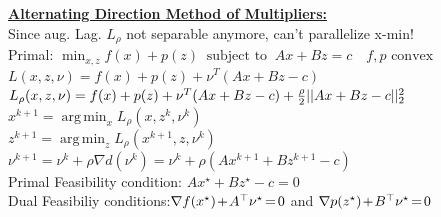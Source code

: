 \documentclass[a4paper,11pt]{article}
\newcommand{\argmin}{\operatorname*{arg\,min}}
\begin{document}
\begin{multicols}{2}
\underline{\textbf{Alternating Direction Method of Multipliers:}}\\
Since aug. Lag. $L_\rho$ not separable anymore, can't parallelize x-min!\\
Primal: $\min_{x, z} f(x) + p(z)\ \text{ subject to }\ Ax+Bz = c \quad f,p \text{ convex}$\\
$L(x, z, \nu) = f(x) + p(z)+ \nu^T (Ax+Bz-c)$\\
$L_\rho(x, z, \nu) = f(x) + p(z)+ \nu^T (Ax+Bz-c) + {\rho \over 2}||Ax + Bz- c||_2^2$\\
\hspace{0.2cm}$x^{k+1} = \argmin_x L_\rho (x, z^k, \nu^k)$\\
\hspace{0.2cm}$z^{k+1} = \argmin_z L_\rho(x^{k+1}, z, \nu^k)$\\
\hspace{0.2cm}$\nu^{k+1} = \nu^k + \rho \nabla d(\nu^k) = \nu^k + \rho(Ax^{k+1}+Bz^{k+1}-c)$\\
Primal Feasibility condition: $Ax^\star + Bz^\star - c = 0$\\
Dual Feasibiliy conditions:$\nabla f(x^\star) \hspace{-0.05cm} + \hspace{-0.05cm} A^\top \nu^\star \hspace{-0.05cm} = \hspace{-0.05cm} 0$ and $\nabla p(z^\star) \hspace{-0.05cm} + \hspace{-0.05cm} B^\top \nu^\star \hspace{-0.05cm} = \hspace{-0.05cm} 0$
\end{multicols}%
\end{document}
